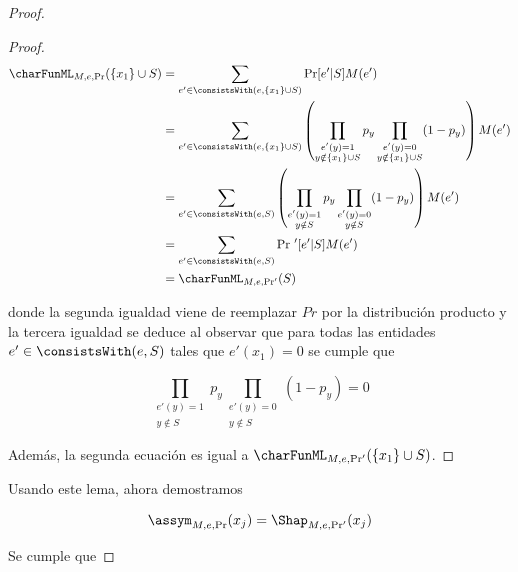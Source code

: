 \begin{proof}
\begin{proof}
    \begin{align}
        \charFunML_{M,e,\Pr}(\{x_1\} \cup S) &= \sum_{e' \in \consistsWith(e,\{x_1\} \cup S)} \Pr[e' | S] M(e') \nonumber \\
        &= \sum_{e' \in \consistsWith(e, \{x_1\} \cup S)} \left( \prod_{\substack{e'(y) = 1 \\ y \notin \{x_1\} \cup S}} p_y \prod_{\substack{e'(y) = 0 \\ y \notin \{x_1\} \cup S}} (1-p_y)\right) M(e')\\
        &= \sum_{e' \in \consistsWith(e, S)} \left( \prod_{\substack{e'(y) = 1 \\ y \notin S}} p_y \prod_{\substack{e'(y) = 0 \\ y \notin S}} (1-p_y)\right) M(e') \nonumber\\
        &= \sum_{e' \in \consistsWith(e, S)} \Pr\,'[e' | S] M(e') \nonumber\\
        &= \charFunML_{M,e,\Pr'}(S) \nonumber
    \end{align}
    
    donde la segunda igualdad viene de reemplazar $Pr$ por la distribución producto y la tercera igualdad se deduce al observar que para todas las entidades $e' \in \consistsWith(e, S)$ tales que $e'(x_1) = 0$ se cumple que 
    
    $$\prod_{\substack{e'(y) = 1 \\ y \notin S}} p_y \prod_{\substack{e'(y) = 0 \\ y \notin S}} (1-p_y) = 0$$
    
    Además, la segunda ecuación es igual a $\charFunML_{M,e,\Pr'}(\{x_1\} \cup S)$.
    \end{proof}

    
    Usando este lema, ahora demostramos
    
    \begin{align}\label{eq:relation_between_assym_and_shap_naive_child}
        \assym_{M,e,\Pr} (x_j) = \Shap_{M,e,\Pr'}(x_j)
    \end{align}
    
    Se cumple que %
    

\end{proof}
